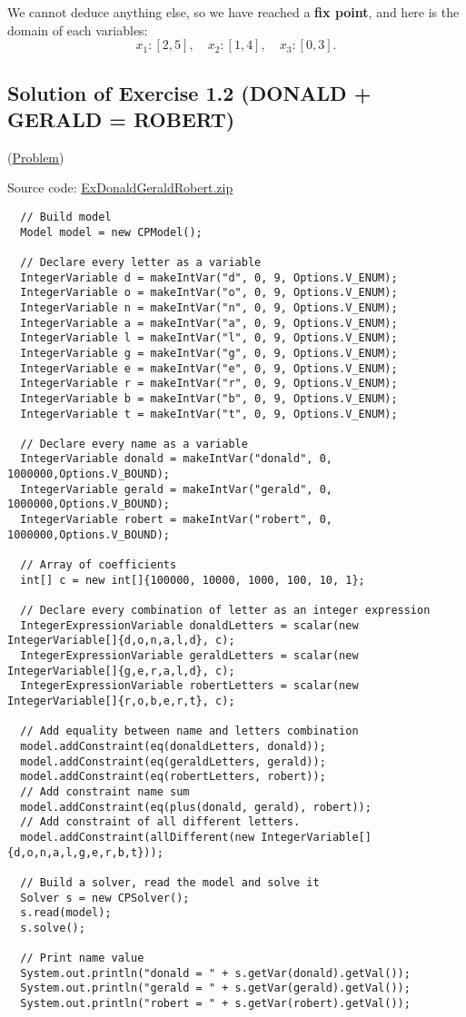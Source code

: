 We cannot deduce anything else, so we have reached a \textbf{fix point}, and here is the domain of each variables:
$$x_{1} : [2,5],\quad x_{2} : [1,4],\quad x_{3} : [0,3].$$


\subsection{Solution of Exercise 1.2 (DONALD + GERALD = ROBERT)}\label{solutions:solutionofexercise1.2}\hypertarget{solutions:solutionofexercise1.2}{}

(\hyperlink{exercises:exercise1.2}{Problem})

Source code: \href{media/zip/exdonaldgeraldrobert.zip}{ExDonaldGeraldRobert.zip}

\begin{lstlisting}
  // Build model
  Model model = new CPModel();
  
  // Declare every letter as a variable
  IntegerVariable d = makeIntVar("d", 0, 9, Options.V_ENUM);
  IntegerVariable o = makeIntVar("o", 0, 9, Options.V_ENUM);
  IntegerVariable n = makeIntVar("n", 0, 9, Options.V_ENUM);
  IntegerVariable a = makeIntVar("a", 0, 9, Options.V_ENUM);
  IntegerVariable l = makeIntVar("l", 0, 9, Options.V_ENUM);
  IntegerVariable g = makeIntVar("g", 0, 9, Options.V_ENUM);
  IntegerVariable e = makeIntVar("e", 0, 9, Options.V_ENUM);
  IntegerVariable r = makeIntVar("r", 0, 9, Options.V_ENUM);
  IntegerVariable b = makeIntVar("b", 0, 9, Options.V_ENUM);
  IntegerVariable t = makeIntVar("t", 0, 9, Options.V_ENUM);
  
  // Declare every name as a variable  
  IntegerVariable donald = makeIntVar("donald", 0, 1000000,Options.V_BOUND);
  IntegerVariable gerald = makeIntVar("gerald", 0, 1000000,Options.V_BOUND);
  IntegerVariable robert = makeIntVar("robert", 0, 1000000,Options.V_BOUND);
  
  // Array of coefficients
  int[] c = new int[]{100000, 10000, 1000, 100, 10, 1}; 
  
  // Declare every combination of letter as an integer expression
  IntegerExpressionVariable donaldLetters = scalar(new IntegerVariable[]{d,o,n,a,l,d}, c);
  IntegerExpressionVariable geraldLetters = scalar(new IntegerVariable[]{g,e,r,a,l,d}, c);
  IntegerExpressionVariable robertLetters = scalar(new IntegerVariable[]{r,o,b,e,r,t}, c);
  
  // Add equality between name and letters combination
  model.addConstraint(eq(donaldLetters, donald));
  model.addConstraint(eq(geraldLetters, gerald));
  model.addConstraint(eq(robertLetters, robert));
  // Add constraint name sum
  model.addConstraint(eq(plus(donald, gerald), robert));
  // Add constraint of all different letters.
  model.addConstraint(allDifferent(new IntegerVariable[]{d,o,n,a,l,g,e,r,b,t}));
  
  // Build a solver, read the model and solve it
  Solver s = new CPSolver();
  s.read(model);
  s.solve();
  
  // Print name value
  System.out.println("donald = " + s.getVar(donald).getVal());
  System.out.println("gerald = " + s.getVar(gerald).getVal());
  System.out.println("robert = " + s.getVar(robert).getVal());
\end{lstlisting}

